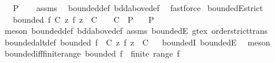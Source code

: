 \begin{isabellebody}
\ \ \ P\isanewline
%
\isadelimproof
\ \ %
\endisadelimproof
%
\isatagproof
{}\isamarkupfalse%
\ assms\ \isamarkupfalse%
\ bounded{\isacharunderscore}{\kern0pt}def\ bdd{\isacharunderscore}{\kern0pt}above{\isacharunderscore}{\kern0pt}def\ \isamarkupfalse%
\ fastforce%
\endisatagproof
{\isafoldproof}%
%
\isadelimproof
\isanewline
%
\endisadelimproof
\isanewline
{}\isamarkupfalse%
\ boundedE{\isacharunderscore}{\kern0pt}strict{\isacharcolon}{\kern0pt}\isanewline
\ \ \ {\isachardoublequoteopen}bounded\ f{\isachardoublequoteclose}\ {\isachardoublequoteopen}{\isasymexists}C{\isachardot}{\kern0pt}\ {\isacharparenleft}{\kern0pt}{\isasymforall}z{\isachardot}{\kern0pt}\ {\isasymbar}f\ z{\isasymbar}\ {\isacharless}{\kern0pt}\ C{\isacharparenright}{\kern0pt}\ {\isasymand}\ {}\ {\isacharless}{\kern0pt}\ C\ {\isasymLongrightarrow}\ P{\isachardoublequoteclose}\isanewline
\ \ \ P\isanewline
%
\isadelimproof
\ \ %
\endisadelimproof
%
\isatagproof
{}\isamarkupfalse%
\ {\isacharparenleft}{\kern0pt}meson\ bounded{\isacharunderscore}{\kern0pt}def\ bdd{\isacharunderscore}{\kern0pt}above{\isacharunderscore}{\kern0pt}def\ assms\ boundedE\ gt{\isacharunderscore}{\kern0pt}ex\ order{\isachardot}{\kern0pt}strict{\isacharunderscore}{\kern0pt}trans{}{\isacharparenright}{\kern0pt}%
\endisatagproof
{\isafoldproof}%
%
\isadelimproof
\isanewline
%
\endisadelimproof
\isanewline
{}\isamarkupfalse%
\ bounded{\isacharunderscore}{\kern0pt}alt{\isacharunderscore}{\kern0pt}def{\isacharcolon}{\kern0pt}\ {\isachardoublequoteopen}bounded\ f\ {\isasymlongleftrightarrow}\ {\isacharparenleft}{\kern0pt}{\isasymexists}C{\isachardot}{\kern0pt}\ {\isasymforall}z{\isachardot}{\kern0pt}\ {\isasymbar}f\ z{\isasymbar}\ {\isasymle}\ C{\isacharparenright}{\kern0pt}{\isachardoublequoteclose}%
\isadelimproof
\ %
\endisadelimproof
%
\isatagproof
{}\isamarkupfalse%
\ boundedI\ boundedE\ \isamarkupfalse%
\ meson%
\endisatagproof
{\isafoldproof}%
%
\isadelimproof
%
\endisadelimproof
\isanewline
\isanewline
{}\isamarkupfalse%
\ bounded{\isacharunderscore}{\kern0pt}iff{\isacharunderscore}{\kern0pt}finite{\isacharunderscore}{\kern0pt}range{\isacharcolon}{\kern0pt}\ {\isachardoublequoteopen}bounded\ f\ {\isasymlongleftrightarrow}\ finite\ {\isacharparenleft}{\kern0pt}range\ f{\isacharparenright}{\kern0pt}{\isachardoublequoteclose}\isanewline
%
\isadelimproof
%
\endisadelimproof
%
\isatagproof
{}\isamarkupfalse%

\end{isabellebody}
